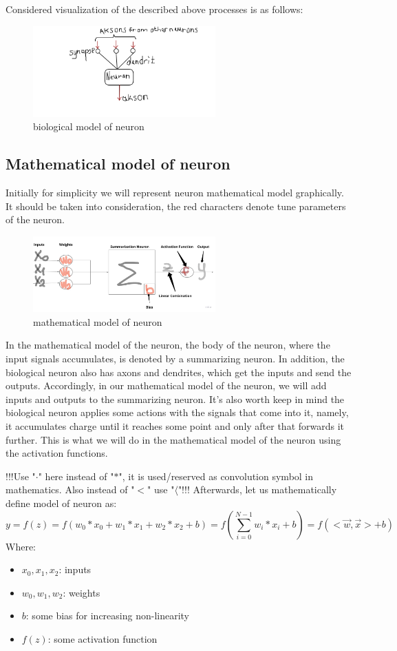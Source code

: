 Considered visualization of the described above processes is as follows:
\begin{figure}[h]
    \centering \includegraphics[width=7cm]{images/neuron_biological_model.png}
    \caption {biological model of neuron}
\end{figure}    

\subsection{Mathematical model of neuron}
Initially for simplicity we will represent neuron mathematical model graphically. It should be taken into consideration, the red characters denote tune parameters of the neuron.     
\begin{figure}[h]
    \centering \includegraphics[width=7cm]{images/neuron_math_model.jpg}
    \caption {mathematical model of neuron}
\end{figure} 

In the mathematical model of the neuron, the body of the neuron, where the input signals accumulates, is denoted by a summarizing neuron. In addition, the biological neuron also has axons and dendrites, which get the inputs and send the outputs. Accordingly, in our mathematical model of the neuron, we will add inputs and outputs to the summarizing neuron. It's also worth keep in mind the biological neuron applies some actions with the signals that come into it, namely, it accumulates charge until it reaches some point and only after that forwards it further. This is what we will do in the mathematical model of the neuron using the activation functions.

!!!Use "$\cdot$" here instead of "$*$", it is used/reserved as convolution symbol in mathematics. Also instead of "$<$" use  "$\langle$"!!!
Afterwards, let us mathematically define model of neuron as:
\[ y = f(z) = f(w_0*x_0+w_1*x_1+w_2*x_2+b) = f(\sum\limits_{i=0}^{N-1} w_i*x_i+b) = f(<\overrightarrow{w}, \overrightarrow{x}>+b) \]
Where:
\begin{itemize}
    \item $x_0, x_1, x_2$: inputs
    \item $w_0, w_1, w_2$: weights 
    \item $b$: some bias for increasing non-linearity   
    \item $f(z)$: some activation function 
\end{itemize}

